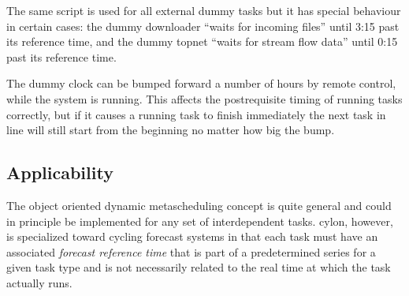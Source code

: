\documentclass[11pt,a4paper]{article}
\begin{document}
The same script is used for all external dummy tasks but it has special
behaviour in certain cases: the dummy downloader ``waits for incoming
files'' until 3:15 past its reference time, and the dummy topnet ``waits
for stream flow data'' until 0:15 past its reference time.

The dummy clock can be bumped forward a number of hours by remote
control, while the system is running. This affects the postrequisite
timing of running tasks correctly, but if it causes a running task to
finish immediately the next task in line will still start from the
beginning no matter how big the bump.







\subsection{Applicability}

The object oriented dynamic metascheduling concept is quite general and
could in principle be implemented for any set of interdependent tasks.
cylon, however, is specialized toward cycling forecast systems in that
each task must have an associated {\em forecast reference time} that is
part of a predetermined series for a given task type and is not
necessarily related to the real time at which the task actually runs.  
\end{document}
